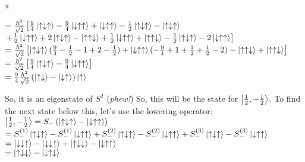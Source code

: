 x\documentclass[12pt]{article}
\begin{document}
\begin{enumerate}[label=\alph*)]
$=\frac{\hbar^2}{\sqrt{2}}\left[\frac{9}{4}\ket{\uparrow\downarrow\uparrow} - \frac{9}{4}\ket{\downarrow\uparrow\uparrow} + \ket{\downarrow\uparrow\uparrow} - \frac{1}{2}\ket{\uparrow\downarrow\uparrow}-\ket{\uparrow\downarrow\uparrow} \right.$\vspace{0.5em}\\
\hspace*{3em}$\left.+ \frac{1}{2}\ket{\downarrow\uparrow\uparrow} + 2\ket{\uparrow\downarrow\uparrow}- \ket{\uparrow\uparrow\downarrow} + \frac{1}{2}\ket{\downarrow\uparrow\uparrow} + \ket{\uparrow\uparrow\downarrow}-\frac{1}{2}\ket{\uparrow\downarrow\uparrow}-2\ket{\downarrow\uparrow\uparrow}\right]$\vspace{0.5em}\\
$=\frac{\hbar^2}{\sqrt{2}}\left[\ket{\uparrow\downarrow\uparrow}(\frac{9}{4}-\frac{1}{2}-1+2-\frac{1}{2}) + \ket{\downarrow\uparrow\uparrow}(-\frac{9}{4}+1 + \frac{1}{2}+\frac{1}{2}-2) -\ket{\uparrow\uparrow\downarrow} + \ket{\uparrow\uparrow\downarrow}\right]$\vspace{0.5em}\\
$= \frac{\hbar^2}{\sqrt{2}}\left[\frac{9}{4}\ket{\uparrow\downarrow\uparrow} - \frac{9}{4}\ket{\downarrow\uparrow\uparrow}\right]$\vspace{0.5em}\\
$= \frac{9}{4}\frac{\hbar^2}{\sqrt{2}}\left(\ket{\uparrow\downarrow} - \ket{\downarrow\uparrow}\right)\ket{\uparrow}$

So, it is an eigenstate of $S^2$ ({\sl phew!}) So, this will be the state for $\ket{\frac{1}{2}, -\frac{1}{2}}$. To find the next state below this, let's use the lowering operator:\vspace{0.5em}\\
$\ket{\frac{1}{2}, -\frac{1}{2}} = S_-\left(\ket{\uparrow\downarrow\uparrow} - \ket{\downarrow\uparrow\uparrow}\right)$\vspace{0.5em}\\
\hspace*{3.5em}$=S_-^{(1)}\ket{\uparrow\downarrow\uparrow}-S_-^{(1)}\ket{\downarrow\uparrow\uparrow} + S_-^{(2)}\ket{\uparrow\downarrow\uparrow}-S_-^{(2)}\ket{\downarrow\uparrow\uparrow}+S_-^{(3)}\ket{\uparrow\downarrow\uparrow} - S_-^{(3)}\ket{\downarrow\uparrow\uparrow}$\vspace{0.5em}\\
\hspace*{3.5em}$= \ket{\downarrow\downarrow\uparrow} - \ket{\downarrow\downarrow\uparrow}+\ket{\uparrow\downarrow\downarrow}-\ket{\downarrow\uparrow\uparrow}$\vspace{0.5em}\\
\hspace*{3.5em}$= \ket{\uparrow\downarrow\downarrow} - \ket{\downarrow\uparrow\downarrow}$


\end{enumerate}
\end{document}
